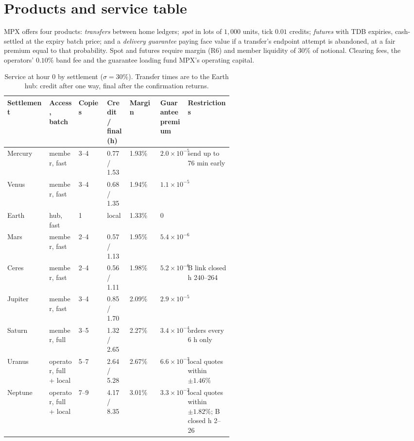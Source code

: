 \section{Products and service table}\label{sec:service}
MPX offers four products: \emph{transfers} between home ledgers; \emph{spot} in lots of $1{,}000$ units, tick $0.01$ credits; \emph{futures} with TDB expiries, cash-settled at the expiry batch price; and a \emph{delivery guarantee} paying face value if a transfer's endpoint attempt is abandoned, at a fair premium equal to that probability. Spot and futures require margin (R6) and member liquidity of $30\%$ of notional. Clearing fees, the operators' $0.10\%$ band fee and the guarantee loading fund MPX's operating capital.
\begin{table}[H]
\centering
\caption{Service at hour 0 by settlement ($\sigma=30\%$). Transfer times are to the Earth hub: credit after one way, final after the confirmation returns.}\label{tab:service}
\small
\begin{tabular}{@{}lp{0.13\linewidth}lp{0.1\linewidth}lp{0.11\linewidth}p{0.2\linewidth}@{}}
\toprule
Settlement & Access, batch & Copies & Credit / final (h) & Margin & Guarantee premium & Restrictions \\
\midrule
Mercury & member, fast & 3--4 & 0.77 / 1.53 & 1.93\% & $2.0\times10^{-5}$ & send up to 76 min early \\
Venus & member, fast & 3--4 & 0.68 / 1.35 & 1.94\% & $1.1\times10^{-5}$ & \\
Earth & hub, fast & 1 & local & 1.33\% & 0 & \\
Mars & member, fast & 2--4 & 0.57 / 1.13 & 1.95\% & $5.4\times10^{-6}$ & \\
Ceres & member, fast & 2--4 & 0.56 / 1.11 & 1.98\% & $5.2\times10^{-6}$ & B link closed h 240--264 \\
Jupiter & member, fast & 3--4 & 0.85 / 1.70 & 2.09\% & $2.9\times10^{-5}$ & \\
Saturn & member, full & 3--5 & 1.32 / 2.65 & 2.27\% & $3.4\times10^{-4}$ & orders every 6 h only \\
Uranus & operator, full + local & 5--7 & 2.64 / 5.28 & 2.67\% & $6.6\times10^{-3}$ & local quotes within $\pm1.46\%$ \\
Neptune & operator, full + local & 7--9 & 4.17 / 8.35 & 3.01\% & $3.3\times10^{-2}$ & local quotes within $\pm1.82\%$; B closed h 2--26 \\
\bottomrule
\end{tabular}
\end{table}
\vspace{-6pt}

